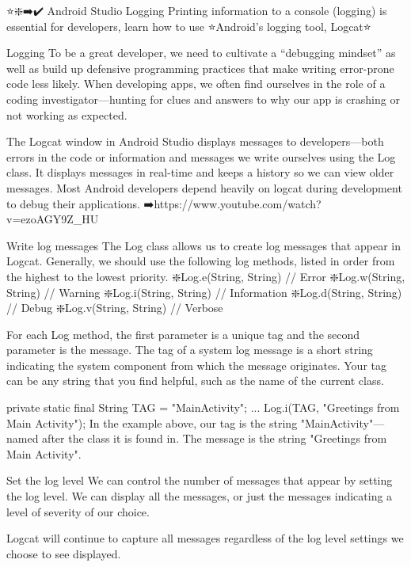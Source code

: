 ⭐❇️➡️✔️
Android Studio Logging
        Printing information to a console (logging) is essential for developers, learn how to use ⭐Android's logging tool, Logcat⭐

    Logging
        To be a great developer, we need to cultivate a “debugging mindset” as well as build up defensive programming practices that make writing error-prone code less likely. When developing apps, we often find ourselves in the role of a coding investigator—hunting for clues and answers to why our app is crashing or not working as expected.

        The Logcat window in Android Studio displays messages to developers—both errors in the code or information and messages we write ourselves using the Log class. It displays messages in real-time and keeps a history so we can view older messages. Most Android developers depend heavily on logcat during development to debug their applications.
            ➡️https://www.youtube.com/watch?v=ezoAGY9Z_HU

    Write log messages
        The Log class allows us to create log messages that appear in Logcat. Generally, we should use the following log methods, listed in order from the highest to the lowest priority.
            ❇️Log.e(String, String) // Error
            ❇️Log.w(String, String) // Warning
            ❇️Log.i(String, String) // Information
            ❇️Log.d(String, String) // Debug
            ❇️Log.v(String, String) // Verbose
        
        For each Log method, the first parameter is a unique tag and the second parameter is the message. The tag of a system log message is a short string indicating the system component from which the message originates. Your tag can be any string that you find helpful, such as the name of the current class.
        
            private static final String TAG = "MainActivity";
            ...
            Log.i(TAG, "Greetings from Main Activity");
        In the example above, our tag is the string "MainActivity"—named after the class it is found in. The message is the string "Greetings from Main Activity".

    Set the log level
        We can control the number of messages that appear by setting the log level. We can display all the messages, or just the messages indicating a level of severity of our choice.

        Logcat will continue to capture all messages regardless of the log level settings we choose to see displayed.

